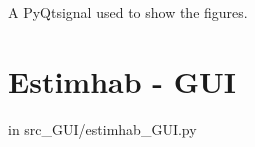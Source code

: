 \documentclass[letterpaper,10pt,english]{sphinxmanual}
\begin{document}
\begin{fulllineitems}
\begin{fulllineitems}
\end{fulllineitems}


\begin{fulllineitems}
\label{\detokenize{index:src_GUI.stathab_GUI.StathabW.show_fig}}
A PyQtsignal used to show the figures.

\end{fulllineitems}


\end{fulllineitems}



\section{Estimhab - GUI}
\label{\detokenize{index:estimhab-gui}}
in src\_GUI/estimhab\_GUI.py
\label{\detokenize{index:module-src_GUI.estimhab_GUI}}
\end{document}
